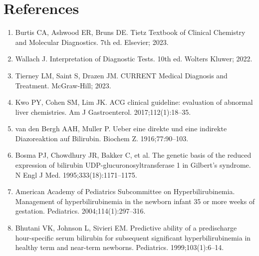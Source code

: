 \section*{References}
\begin{enumerate}
  \item Burtis CA, Ashwood ER, Bruns DE. Tietz Textbook of Clinical Chemistry and Molecular Diagnostics. 7th ed. Elsevier; 2023.
  \item Wallach J. Interpretation of Diagnostic Tests. 10th ed. Wolters Kluwer; 2022.
  \item Tierney LM, Saint S, Drazen JM. CURRENT Medical Diagnosis and Treatment. McGraw-Hill; 2023.
  \item Kwo PY, Cohen SM, Lim JK. ACG clinical guideline: evaluation of abnormal liver chemistries. Am J Gastroenterol. 2017;112(1):18--35.
  \item van den Bergh AAH, Muller P. Ueber eine direkte und eine indirekte Diazoreaktion auf Bilirubin. Biochem Z. 1916;77:90--103.
  \item Bosma PJ, Chowdhury JR, Bakker C, et al. The genetic basis of the reduced expression of bilirubin UDP-glucuronosyltransferase 1 in Gilbert's syndrome. N Engl J Med. 1995;333(18):1171--1175.
  \item American Academy of Pediatrics Subcommittee on Hyperbilirubinemia. Management of hyperbilirubinemia in the newborn infant 35 or more weeks of gestation. Pediatrics. 2004;114(1):297--316.
  \item Bhutani VK, Johnson L, Sivieri EM. Predictive ability of a predischarge hour-specific serum bilirubin for subsequent significant hyperbilirubinemia in healthy term and near-term newborns. Pediatrics. 1999;103(1):6--14.
\end{enumerate}

\clearpage
